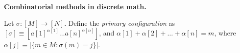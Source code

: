 \documentclass{article}
\begin{document}
\textbf{Combinatorial methods in discrete math.}



Let $\sigma: [M] \rightarrow [N]$. Define the \emph{primary configuration}
as $[\sigma] \equiv [a[1]^{\alpha[1]} \dots a[n]^{\alpha[n]}]$,
and $\alpha[1] + \alpha[2] + \dots + \alpha[n] = m$, where
$\alpha[j] \equiv |\{ m \in M : \sigma(m) = j \}|$.
\end{document}

